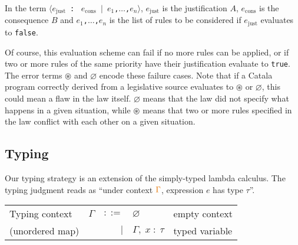 \documentclass[11pt,a4paper]{article}
\newcommand{\synvar}[1]{\ensuremath{#1}}
\newcommand{\synkeyword}[1]{\textcolor{red!60!black}{\texttt{#1}}}
\newcommand{\synpunct}[1]{\textcolor{black!40!white}{\texttt{#1}}}
\newcommand{\synjust}{~\synpunct{:\raisebox{-0.9pt}{-}}~}
\newcommand{\syntrue}{\synkeyword{true}}
\newcommand{\synfalse}{\synkeyword{false}}
\newcommand{\synlangle}{\synpunct{$\langle$}}
\newcommand{\synrangle}{\synpunct{$\rangle$}}
\newcommand{\synmid}{\synpunct{~$|$~}}
\newcommand{\synemptydefault}{\synvar{\varnothing}}
\newcommand{\synerror}{\synvar{\circledast}}
\newcommand{\synellipsis}{\synpunct{,$\ldots$,}}
\newcommand{\syndef}{$ ::= $}
\newcommand{\synalt}{\;$|$\;}
\newcommand{\typctx}[1]{\textcolor{orange!90!black}{\ensuremath{#1}}}
\newcommand{\typempty}{\typctx{\varnothing}}
\newcommand{\typcomma}{\typctx{,\;}}
\newcommand{\typvdash}{\typctx{\;\vdash\;}}
\newcommand{\typcolon}{\typctx{\;:\;}}
\begin{document}
In the term \synlangle\synvar{e_{\text{just}}}\synjust
\synvar{e_{\text{cons}}}\synmid \synvar{e_1}\synellipsis\synvar{e_n}\synrangle, \synvar{e_{\text{just}}} 
is the justification $A$, \synvar{e_{\text{cons}}} is the consequence $B$ and 
\synvar{e_1}\synellipsis\synvar{e_n} is the list of rules to be considered if \synvar{e_{\text{just}}} 
evaluates to \synfalse{}. 
 
Of course, this evaluation scheme can fail if no more 
rules can be applied, or if two or more rules of the same priority have their 
justification evaluate to \syntrue{}. The error terms \synerror{} and \synemptydefault{}
encode these failure cases. Note that if a Catala program correctly derived from a legislative 
source evaluates to \synerror{} or \synemptydefault{}, this could mean a flaw in the 
law itself. \synemptydefault{} means that the law did not specify what happens 
in a given situation, while \synerror{} means that two or more rules specified in 
the law conflict with each other on a given situation.

\subsection{Typing}
\label{sec:defaultcalc:typing}

Our typing strategy is an extension of the simply-typed lambda calculus.
The typing judgment \fbox{$\typctx{\Gamma}\typvdash\synvar{e}\typcolon\synvar{\tau}$} reads as
\enquote{under context $\typctx{\Gamma}$, expression $\synvar{e}$ has type $\synvar{\tau}$}.
\begin{center}
  \begin{tabular}{lrrll}
    Typing context&\typctx{\Gamma}&\syndef&\typempty&empty context\\
    (unordered map)&&\synalt&\typctx{\Gamma}\typcomma\synvar{x}\typcolon\synvar{\tau}&typed variable\\
  \end{tabular}
\end{center}
\end{document}
